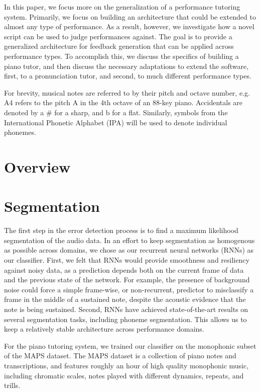 \documentclass[twocolumn]{article}
\begin{document}
In this paper, we focus more on the generalization of a performance tutoring system. Primarily, we focus on building an architecture that could be extended to almost any type of performance. As a result, however, we investigate how a novel script can be used to judge performances against. The goal is to provide a generalized architecture for feedback generation that can be applied across performance types. To accomplish this, we discuss the specifics of building a piano tutor, and then discuss the necessary adaptations to extend the software, first, to a pronunciation tutor, and second, to much different performance types.

For brevity, musical notes are referred to by their pitch and octave number, e.g. A4 refers to the pitch A in the 4th octave of an 88-key piano. Accidentals are denoted by a \# for a sharp, and b for a flat. Similarly, symbols from the International Phonetic Alphabet (IPA) will be used to denote individual phonemes.

\section{Overview}

\section{Segmentation}

The first step in the error detection process is to find a maximum likelihood segmentation of the audio data. In an effort to keep segmentation as homogenous as possible across domains, we chose as our recurrent neural networks (RNNs) as our classifier. First, we felt that RNNs would provide smoothness and resiliency against noisy data, as a prediction depends both on the current frame of data and the previous state of the network. For example, the presence of background noise could force a simple frame-wise, or non-recurrent, predictor to misclassify a frame in the middle of a sustained note, despite the acoustic evidence that the note is being sustained. Second, RNNs have achieved state-of-the-art results on several segmentation tasks, including phoneme segmentation. This allows us to keep a relatively stable architecture across performance domains.

For the piano tutoring system, we trained our classifier on the monophonic subset of the MAPS dataset. The MAPS dataset is a collection of piano notes and transcriptions, and features roughly an hour of high quality monophonic music, including chromatic scales, notes played with different dynamics, repeats, and trills.
\end{document}
